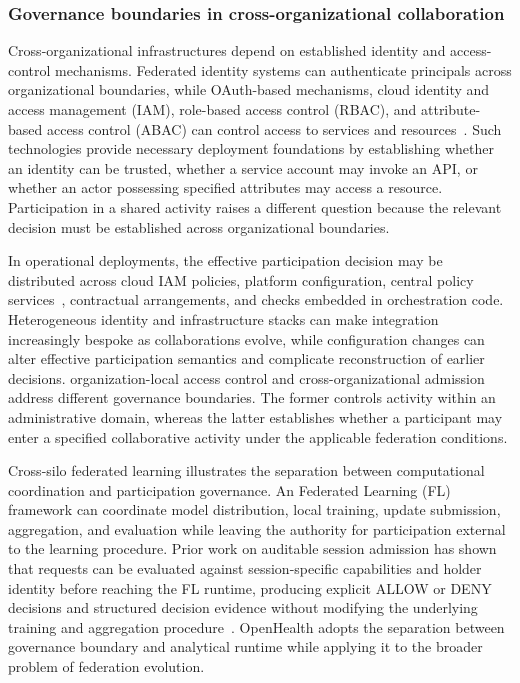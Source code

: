 \documentclass[twoside,11pt]{article}
\begin{document}
\subsubsection{Governance boundaries in cross-organizational collaboration}
Cross-organizational infrastructures depend on established identity and access-control mechanisms. Federated identity systems can authenticate principals across organizational boundaries, while OAuth-based mechanisms, cloud identity and access management (IAM), role-based access control (RBAC), and attribute-based access control (ABAC) can control access to services and resources~\cite{Selvanathan_2019, rfc6749, sandhu_1996, hu_2014}. Such technologies provide necessary deployment foundations by establishing whether an identity can be trusted, whether a service account may invoke an API, or whether an actor possessing specified attributes may access a resource. Participation in a shared activity raises a different question because the relevant decision must be established across organizational boundaries.

In operational deployments, the effective participation decision may be distributed across cloud IAM policies, platform configuration, central policy services~\cite{opa_docs, cedar_2024, Chuprikov_2025}, contractual arrangements, and checks embedded in orchestration code. Heterogeneous identity and infrastructure stacks can make integration increasingly bespoke as collaborations evolve, while configuration changes can alter effective participation semantics and complicate reconstruction of earlier decisions. organization-local access control and cross-organizational admission  address different governance boundaries. The former controls activity within an administrative domain, whereas the latter establishes whether a participant may enter a specified collaborative activity under the applicable federation conditions.

Cross-silo federated learning illustrates the separation between computational coordination and participation governance. An Federated Learning (FL) framework can coordinate model distribution, local training, update submission, aggregation, and evaluation while leaving the authority for participation external to the learning procedure. Prior work on auditable session admission has shown that requests can be evaluated against session-specific capabilities and holder identity before reaching the FL runtime, producing explicit ALLOW or DENY decisions and structured decision evidence without modifying the underlying training and aggregation procedure~\cite{Fenoglio_FLICS_2026}. OpenHealth adopts the separation between governance boundary and analytical runtime while applying it to the broader problem of federation evolution.
\end{document}
